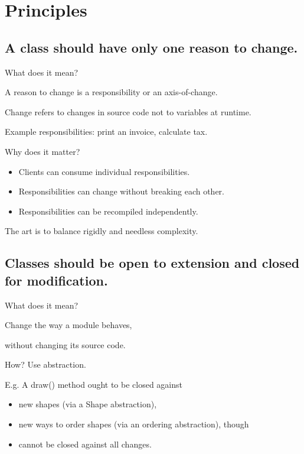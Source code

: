 \documentclass{beamer}
\begin{document}
\section{Principles}

\subsection{A class should have only one reason to change.}

\begin{frame}{What does it mean?}
    \par A reason to change is a responsibility or an axis-of-change.
    \par Change refers to changes in source code not to variables at runtime.
    \par Example responsibilities: print an invoice, calculate tax.
\end{frame}

\begin{frame}{Why does it matter?}
    \begin{itemize}
        \item Clients can consume individual responsibilities.
        \item Responsibilities can change without breaking each other.
        \item Responsibilities can be recompiled independently.
    \end{itemize}
    \par The art is to balance rigidly and needless complexity. 
\end{frame}

\begin{frame}{}
    
\end{frame}

\begin{frame}{}
    
\end{frame}

\subsection{Classes should be open to extension and closed for modification.}

\begin{frame}{What does it mean?}
    \par Change the way a module behaves,
    \par without changing its source code.
    \par How? Use abstraction.
    \par E.g. A draw() method ought to be closed against
    \begin{itemize}
        \item new shapes (via a Shape abstraction),
        \item new ways to order shapes (via an ordering abstraction), though
        \item cannot be closed against all changes. 
    \end{itemize}
\end{frame}
\end{document}
